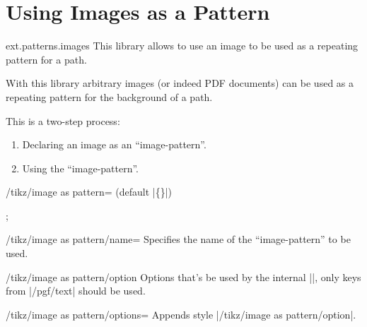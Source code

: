 %
%
%
\clearpage
\section{Using Images as a Pattern}
\label{library:patterns.images}

\begin{tikzlibrary}{ext.patterns.images}
  This library allows to use an image to be used as a repeating pattern for a path.
\end{tikzlibrary}

With this library arbitrary images (or indeed PDF documents) can be used as
a repeating pattern for the background of a path.

This is a two-step process:
\begin{enumerate}
\item Declaring an image as an ``image-pattern''.
\item Using the ``image-pattern''.
\end{enumerate}

\begin{command}{\pgfsetupimageaspattern{}}
\end{command}

\begin{key}{/tikz/image as pattern= (default |\{\}|)}

\begin{codeexample}[preamble=\usetikzlibrary{ext.patterns.images}]
\tikz \node[star, minimum size=3cm, draw,
  image as pattern={name=grid,options={left, bottom, y=-.5cm, rotate=45}}] {};
\end{codeexample}
\end{key}

\begin{key}{/tikz/image as pattern/name=}
Specifies the name of the ``image-pattern'' to be used.
\end{key}

\begin{stylekey}{/tikz/image as pattern/option}
Options that's be used by the internal |\pgftext|,\indexCommandO{\pgftext}
only keys from |/pgf/text| should be used.
\end{stylekey}

\begin{stylekey}{/tikz/image as pattern/options=}
Appends style |/tikz/image as pattern/option|.
\end{stylekey}